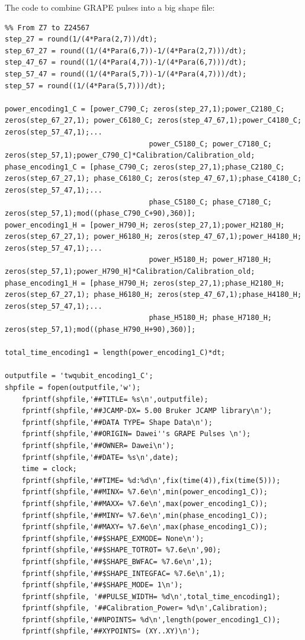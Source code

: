 \clearpage
\hypertarget{code:combine_encoding1}{The code to combine GRAPE pulses into a big shape file:}
\begin{lstlisting}
%% From Z7 to Z24567
step_27 = round(1/(4*Para(2,7))/dt);
step_67_27 = round((1/(4*Para(6,7))-1/(4*Para(2,7)))/dt);
step_47_67 = round((1/(4*Para(4,7))-1/(4*Para(6,7)))/dt);
step_57_47 = round((1/(4*Para(5,7))-1/(4*Para(4,7)))/dt);
step_57 = round((1/(4*Para(5,7)))/dt);

power_encoding1_C = [power_C790_C; zeros(step_27,1);power_C2180_C; zeros(step_67_27,1); power_C6180_C; zeros(step_47_67,1);power_C4180_C; zeros(step_57_47,1);...
                                  power_C5180_C; power_C7180_C; zeros(step_57,1);power_C790_C]*Calibration/Calibration_old;
phase_encoding1_C = [phase_C790_C; zeros(step_27,1);phase_C2180_C; zeros(step_67_27,1); phase_C6180_C; zeros(step_47_67,1);phase_C4180_C; zeros(step_57_47,1);...
                                  phase_C5180_C; phase_C7180_C; zeros(step_57,1);mod((phase_C790_C+90),360)];
power_encoding1_H = [power_H790_H; zeros(step_27,1);power_H2180_H; zeros(step_67_27,1); power_H6180_H; zeros(step_47_67,1);power_H4180_H; zeros(step_57_47,1);...
                                  power_H5180_H; power_H7180_H; zeros(step_57,1);power_H790_H]*Calibration/Calibration_old;
phase_encoding1_H = [phase_H790_H; zeros(step_27,1);phase_H2180_H; zeros(step_67_27,1); phase_H6180_H; zeros(step_47_67,1);phase_H4180_H; zeros(step_57_47,1);...
                                  phase_H5180_H; phase_H7180_H; zeros(step_57,1);mod((phase_H790_H+90),360)];

total_time_encoding1 = length(power_encoding1_C)*dt;

outputfile = 'twqubit_encoding1_C';
shpfile = fopen(outputfile,'w');
    fprintf(shpfile,'##TITLE= %s\n',outputfile);
    fprintf(shpfile,'##JCAMP-DX= 5.00 Bruker JCAMP library\n');
    fprintf(shpfile,'##DATA TYPE= Shape Data\n');
    fprintf(shpfile,'##ORIGIN= Dawei''s GRAPE Pulses \n');
    fprintf(shpfile,'##OWNER= Dawei\n');
    fprintf(shpfile,'##DATE= %s\n',date);
    time = clock;
    fprintf(shpfile,'##TIME= %d:%d\n',fix(time(4)),fix(time(5)));
    fprintf(shpfile,'##MINX= %7.6e\n',min(power_encoding1_C));
    fprintf(shpfile,'##MAXX= %7.6e\n',max(power_encoding1_C));
    fprintf(shpfile,'##MINY= %7.6e\n',min(phase_encoding1_C));
    fprintf(shpfile,'##MAXY= %7.6e\n',max(phase_encoding1_C));
    fprintf(shpfile,'##$SHAPE_EXMODE= None\n');
    fprintf(shpfile,'##$SHAPE_TOTROT= %7.6e\n',90);
    fprintf(shpfile,'##$SHAPE_BWFAC= %7.6e\n',1);
    fprintf(shpfile,'##$SHAPE_INTEGFAC= %7.6e\n',1);
    fprintf(shpfile,'##$SHAPE_MODE= 1\n');
    fprintf(shpfile, '##PULSE_WIDTH= %d\n',total_time_encoding1);
    fprintf(shpfile, '##Calibration_Power= %d\n',Calibration);
    fprintf(shpfile,'##NPOINTS= %d\n',length(power_encoding1_C));
    fprintf(shpfile,'##XYPOINTS= (XY..XY)\n');


\end{lstlisting}
